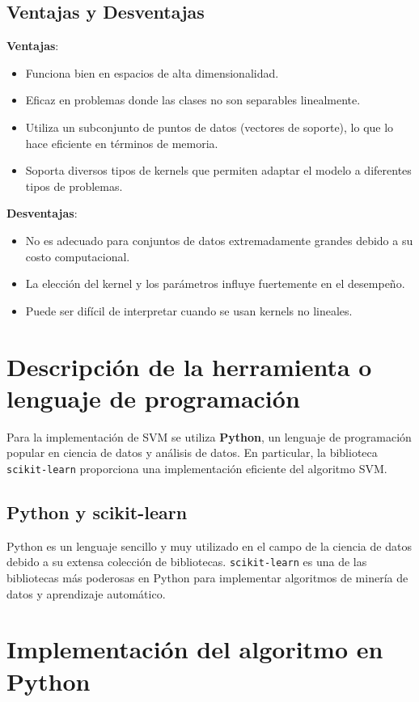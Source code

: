 \documentclass[a4paper,12pt]{article}
\begin{document}
\subsection{Ventajas y Desventajas}

\textbf{Ventajas}:
\begin{itemize}
    \item Funciona bien en espacios de alta dimensionalidad.
    \item Eficaz en problemas donde las clases no son separables linealmente.
    \item Utiliza un subconjunto de puntos de datos (vectores de soporte), lo que lo hace eficiente en términos de memoria.
    \item Soporta diversos tipos de kernels que permiten adaptar el modelo a diferentes tipos de problemas.
\end{itemize}

\textbf{Desventajas}:
\begin{itemize}
    \item No es adecuado para conjuntos de datos extremadamente grandes debido a su costo computacional.
    \item La elección del kernel y los parámetros influye fuertemente en el desempeño.
    \item Puede ser difícil de interpretar cuando se usan kernels no lineales.
\end{itemize}

\section{Descripción de la herramienta o lenguaje de programación}

Para la implementación de SVM se utiliza \textbf{Python}, un lenguaje de programación popular en ciencia de datos y análisis de datos. En particular, la biblioteca \texttt{scikit-learn} proporciona una implementación eficiente del algoritmo SVM.

\subsection{Python y scikit-learn}
Python es un lenguaje sencillo y muy utilizado en el campo de la ciencia de datos debido a su extensa colección de bibliotecas. \texttt{scikit-learn} es una de las bibliotecas más poderosas en Python para implementar algoritmos de minería de datos y aprendizaje automático.

\section{Implementación del algoritmo en Python}
\end{document}
